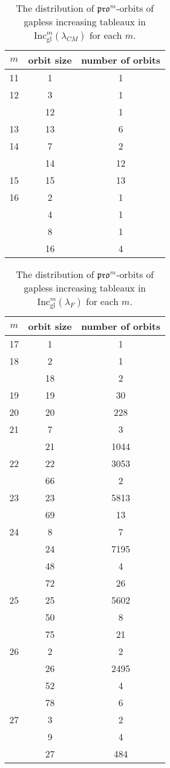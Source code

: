 \documentclass[12pt]{amsart}
\theoremstyle{definition}
\theoremstyle{remark}
\numberwithin{equation}{section}
\newcommand{\inc}{\ensuremath{\mathrm{Inc}}}
\newcommand{\incgl}{\inc_{\mathrm{gl}}}
\newcommand{\pro}{\mathfrak{pro}}
\begin{document}
\begin{table}[h]
\begin{tabular}{|c|c|c|}
\hline
$m$ & orbit size & number of orbits\\
  \hline
  11 & 1 & 1\\
  \hline
  12 & 3 & 1\\ \cline{2-3}
   & 12 & 1 \\
   \hline
  13 & 13 & 6\\
  \hline
  14 & 7 & 2\\\cline{2-3}
  & 14 & 12\\
  \hline
    15 & 15 & 13\\
  \hline
  16 & 2 & 1\\\cline{2-3}
   & 4 & 1\\\cline{2-3}
   & 8 & 1\\\cline{2-3}
  & 16 & 4\\
  \hline
\end{tabular}
\caption{The distribution of $\pro^m$-orbits of gapless increasing tableaux in $\incgl^m(\lambda_{CM})$ for each $m$.}
\label{tab:E6}
\end{table}

\begin{table}[h]
\begin{tabular}{|c|c|c|}
\hline
$m$ & orbit size & number of orbits\\
  \hline
  17 & 1 & 1\\
  \hline
  18 & 2 & 1\\ \cline{2-3}
   & 18 & 2 \\
   \hline
  19 & 19 & 30\\
  \hline
  20 & 20 & 228\\
  \hline
    21 & 7 & 3\\ \cline{2-3}
    & 21 & 1044 \\
  \hline
  22 & 22 & 3053\\\cline{2-3}
   & 66 & 2\\
  \hline
  23 & 23 & 5813\\ \cline{2-3}
  & 69 & 13 \\
   \hline
  24 & 8 & 7\\\cline{2-3}
   & 24 & 7195\\\cline{2-3}
   & 48 & 4\\\cline{2-3}
   & 72 & 26\\
   \hline
  25 & 25 & 5602\\ \cline{2-3}
  & 50 & 8 \\ \cline{2-3}
  & 75 & 21 \\
   \hline
  26 & 2 & 2\\ \cline{2-3}
  & 26 & 2495 \\ \cline{2-3}
  & 52 & 4 \\ \cline{2-3}
  & 78 & 6 \\
   \hline
 27 & 3 & 2\\ \cline{2-3}
  & 9 & 4 \\ \cline{2-3}
  & 27 & 484 \\
  \hline
\end{tabular}
\caption{The distribution of $\pro^m$-orbits of gapless increasing tableaux in $\incgl^m(\lambda_F)$ for each $m$.}
\label{tab:E7}
\end{table}
\end{document}
